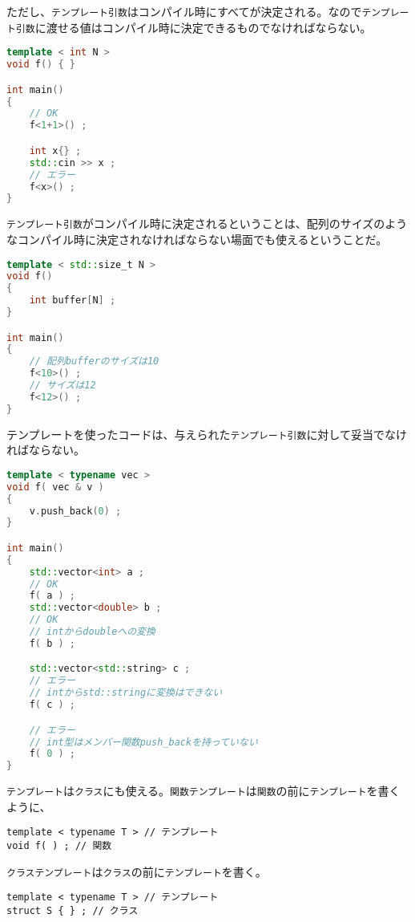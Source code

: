 ただし、\texttt{テンプレート引数}はコンパイル時にすべてが決定される。なので\texttt{テンプレート引数}に渡せる値はコンパイル時に決定できるものでなければならない。

\begin{lstlisting}[language={C++}]
template < int N >
void f() { }

int main()
{
    // OK
    f<1+1>() ;

    int x{} ;
    std::cin >> x ;
    // エラー
    f<x>() ;
}
\end{lstlisting}

\texttt{テンプレート引数}がコンパイル時に決定されるということは、配列のサイズのようなコンパイル時に決定されなければならない場面でも使えるということだ。

\begin{lstlisting}[language={C++}]
template < std::size_t N >
void f()
{
    int buffer[N] ;
}

int main()
{
    // 配列bufferのサイズは10
    f<10>() ;
    // サイズは12
    f<12>() ;
}
\end{lstlisting}

テンプレートを使ったコードは、与えられた\texttt{テンプレート引数}に対して妥当でなければならない。

\begin{lstlisting}[language={C++}]
template < typename vec >
void f( vec & v )
{
    v.push_back(0) ;
}

int main()
{
    std::vector<int> a ;
    // OK
    f( a ) ;
    std::vector<double> b ;
    // OK
    // intからdoubleへの変換
    f( b ) ;

    std::vector<std::string> c ;
    // エラー
    // intからstd::stringに変換はできない
    f( c ) ;

    // エラー
    // int型はメンバー関数push_backを持っていない
    f( 0 ) ;
}
\end{lstlisting}


\texttt{テンプレート}は\texttt{クラス}にも使える。\texttt{関数テンプレート}は\texttt{関数}の前に\texttt{テンプレート}を書くように、
\begin{lstlisting}[style=grammar]
template < typename T > // テンプレート
void f( ) ; // 関数
\end{lstlisting}
\texttt{クラステンプレート}は\texttt{クラス}の前に\texttt{テンプレート}を書く。
\begin{lstlisting}[style=grammar]
template < typename T > // テンプレート
struct S { } ; // クラス
\end{lstlisting}


